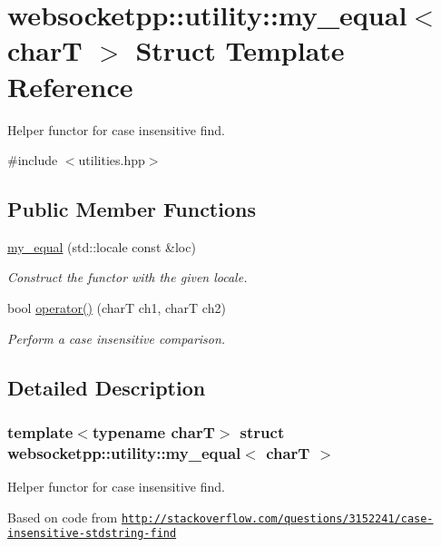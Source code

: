 \hypertarget{structwebsocketpp_1_1utility_1_1my__equal}{}\section{websocketpp\+:\+:utility\+:\+:my\+\_\+equal$<$ charT $>$ Struct Template Reference}
\label{structwebsocketpp_1_1utility_1_1my__equal}


Helper functor for case insensitive find.  




{\ttfamily \#include $<$utilities.\+hpp$>$}

\subsection*{Public Member Functions}
\begin{DoxyCompactItemize}
\item 
\mbox{\hyperlink{structwebsocketpp_1_1utility_1_1my__equal_a8f03de886784304ffd39ed5de677af1f}{my\+\_\+equal}} (std\+::locale const \&loc)
\begin{DoxyCompactList}\small\item\em Construct the functor with the given locale. \end{DoxyCompactList}\item 
bool \mbox{\hyperlink{structwebsocketpp_1_1utility_1_1my__equal_a06b93db62003458703574e6421f9875f}{operator()}} (charT ch1, charT ch2)
\begin{DoxyCompactList}\small\item\em Perform a case insensitive comparison. \end{DoxyCompactList}\end{DoxyCompactItemize}


\subsection{Detailed Description}
\subsubsection*{template$<$typename charT$>$\newline
struct websocketpp\+::utility\+::my\+\_\+equal$<$ char\+T $>$}

Helper functor for case insensitive find. 

Based on code from \href{http://stackoverflow.com/questions/3152241/case-insensitive-stdstring-find}{\tt http\+://stackoverflow.\+com/questions/3152241/case-\/insensitive-\/stdstring-\/find}

